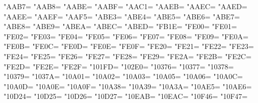 \XeTeXcharclass"AAB7=\KclassCM
\XeTeXcharclass"AAB8=\KclassCM
\XeTeXcharclass"AABE=\KclassCM
\XeTeXcharclass"AABF=\KclassCM
\XeTeXcharclass"AAC1=\KclassCM
\XeTeXcharclass"AAEB=\KclassCM
\XeTeXcharclass"AAEC=\KclassCM
\XeTeXcharclass"AAED=\KclassCM
\XeTeXcharclass"AAEE=\KclassCM
\XeTeXcharclass"AAEF=\KclassCM
\XeTeXcharclass"AAF5=\KclassCM
\XeTeXcharclass"ABE3=\KclassCM
\XeTeXcharclass"ABE4=\KclassCM
\XeTeXcharclass"ABE5=\KclassCM
\XeTeXcharclass"ABE6=\KclassCM
\XeTeXcharclass"ABE7=\KclassCM
\XeTeXcharclass"ABE8=\KclassCM
\XeTeXcharclass"ABE9=\KclassCM
\XeTeXcharclass"ABEA=\KclassCM
\XeTeXcharclass"ABEC=\KclassCM
\XeTeXcharclass"ABED=\KclassCM
\XeTeXcharclass"FB1E=\KclassCM
\XeTeXcharclass"FE00=\KclassCM
\XeTeXcharclass"FE01=\KclassCM
\XeTeXcharclass"FE02=\KclassCM
\XeTeXcharclass"FE03=\KclassCM
\XeTeXcharclass"FE04=\KclassCM
\XeTeXcharclass"FE05=\KclassCM
\XeTeXcharclass"FE06=\KclassCM
\XeTeXcharclass"FE07=\KclassCM
\XeTeXcharclass"FE08=\KclassCM
\XeTeXcharclass"FE09=\KclassCM
\XeTeXcharclass"FE0A=\KclassCM
\XeTeXcharclass"FE0B=\KclassCM
\XeTeXcharclass"FE0C=\KclassCM
\XeTeXcharclass"FE0D=\KclassCM
\XeTeXcharclass"FE0E=\KclassCM
\XeTeXcharclass"FE0F=\KclassCM
\XeTeXcharclass"FE20=\KclassCM
\XeTeXcharclass"FE21=\KclassCM
\XeTeXcharclass"FE22=\KclassCM
\XeTeXcharclass"FE23=\KclassCM
\XeTeXcharclass"FE24=\KclassCM
\XeTeXcharclass"FE25=\KclassCM
\XeTeXcharclass"FE26=\KclassCM
\XeTeXcharclass"FE27=\KclassCM
\XeTeXcharclass"FE28=\KclassCM
\XeTeXcharclass"FE29=\KclassCM
\XeTeXcharclass"FE2A=\KclassCM
\XeTeXcharclass"FE2B=\KclassCM
\XeTeXcharclass"FE2C=\KclassCM
\XeTeXcharclass"FE2D=\KclassCM
\XeTeXcharclass"FE2E=\KclassCM
\XeTeXcharclass"FE2F=\KclassCM
\XeTeXcharclass"101FD=\KclassCM
\XeTeXcharclass"102E0=\KclassCM
\XeTeXcharclass"10376=\KclassCM
\XeTeXcharclass"10377=\KclassCM
\XeTeXcharclass"10378=\KclassCM
\XeTeXcharclass"10379=\KclassCM
\XeTeXcharclass"1037A=\KclassCM
\XeTeXcharclass"10A01=\KclassCM
\XeTeXcharclass"10A02=\KclassCM
\XeTeXcharclass"10A03=\KclassCM
\XeTeXcharclass"10A05=\KclassCM
\XeTeXcharclass"10A06=\KclassCM
\XeTeXcharclass"10A0C=\KclassCM
\XeTeXcharclass"10A0D=\KclassCM
\XeTeXcharclass"10A0E=\KclassCM
\XeTeXcharclass"10A0F=\KclassCM
\XeTeXcharclass"10A38=\KclassCM
\XeTeXcharclass"10A39=\KclassCM
\XeTeXcharclass"10A3A=\KclassCM
\XeTeXcharclass"10AE5=\KclassCM
\XeTeXcharclass"10AE6=\KclassCM
\XeTeXcharclass"10D24=\KclassCM
\XeTeXcharclass"10D25=\KclassCM
\XeTeXcharclass"10D26=\KclassCM
\XeTeXcharclass"10D27=\KclassCM
\XeTeXcharclass"10EAB=\KclassCM
\XeTeXcharclass"10EAC=\KclassCM
\XeTeXcharclass"10F46=\KclassCM
\XeTeXcharclass"10F47=\KclassCM
